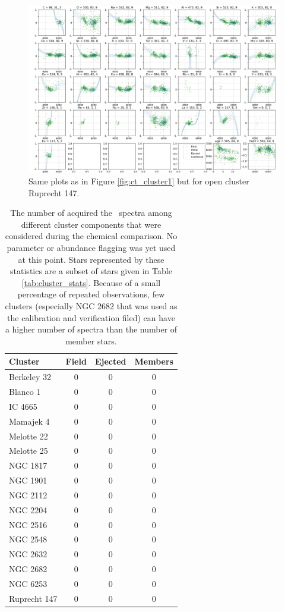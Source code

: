 \begin{figure}
	\centering
	\includegraphics[width=\textwidth]{p_teff_abundances_Ruprecht_147_orbits_DR3_new_flag0.png}
	\caption{Same plots as in Figure \ref{fig:ct_cluster1} but for open cluster Ruprecht 147.}
	\label{fig:ct_cluster4}
\end{figure}

\begin{table}
	\centering
	\caption{The number of acquired the \Gh\ spectra among different cluster components that were considered during the chemical comparison. No parameter or abundance flagging was yet used at this point. Stars represented by these statistics are a subset of stars given in Table \ref{tab:cluster_stats}. Because of a small percentage of repeated observations, few clusters (especially NGC 2682 that was used as the calibration and verification filed) can have a higher number of spectra than the number of member stars.}
	\begin{tabular}{l | c | c | c }
		\hline
		Cluster & Field & Ejected & Members \\
		\hline
		Berkeley 32  & 0 & 0 & 0 \\ 
		Blanco 1     & 0 & 0 & 0 \\
		IC 4665      & 0 & 0 & 0 \\
		Mamajek 4    & 0 & 0 & 0 \\
		Melotte 22   & 0 & 0 & 0 \\
		Melotte 25   & 0 & 0 & 0 \\
		NGC 1817     & 0 & 0 & 0 \\
		NGC 1901     & 0 & 0 & 0 \\
		NGC 2112     & 0 & 0 & 0 \\
		NGC 2204     & 0 & 0 & 0 \\
		NGC 2516     & 0 & 0 & 0 \\
		NGC 2548     & 0 & 0 & 0 \\
		NGC 2632     & 0 & 0 & 0 \\
		NGC 2682     & 0 & 0 & 0 \\
		NGC 6253     & 0 & 0 & 0 \\
		Ruprecht 147 & 0 & 0 & 0 \\
		\hline
	\end{tabular}
	\label{tab:cluster_stats_abund}
\end{table}

